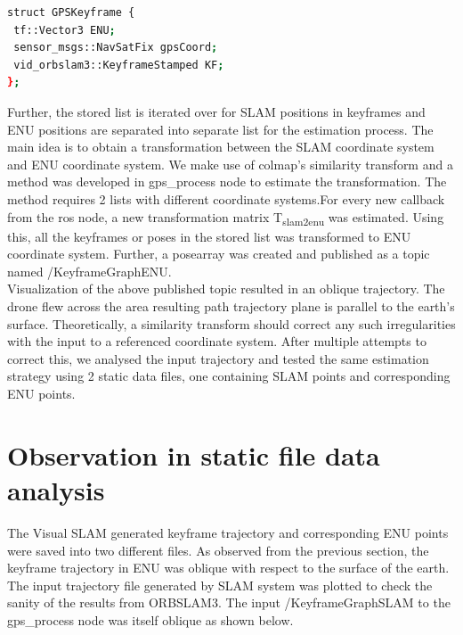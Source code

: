 \begin{lstlisting}[language=bash, basicstyle=\small]
struct GPSKeyframe {
 tf::Vector3 ENU;  
 sensor_msgs::NavSatFix gpsCoord; 
 vid_orbslam3::KeyframeStamped KF; 
};
\end{lstlisting}

Further, the stored list is iterated over for SLAM positions in keyframes and ENU positions are separated into separate list for the estimation process. The main idea is to obtain a transformation between the SLAM coordinate system and ENU coordinate system. We make use of colmap's \cite{schoenberger2016sfm} similarity transform and a method was developed in gps\_process node to estimate the transformation. The method requires 2 lists with different coordinate systems.For every new callback from the ros node, a new transformation matrix  T\textsubscript{slam2enu} was estimated. Using this, all the keyframes or poses in the stored list was transformed to ENU coordinate system. Further, a posearray was created and published as a topic named /KeyframeGraphENU.\\

Visualization of the above published topic resulted in an oblique trajectory. The drone flew across the area resulting path trajectory plane is parallel to the earth's surface. Theoretically, a similarity transform should correct any such irregularities with the input to a referenced coordinate system. After multiple attempts to correct this, we analysed the input trajectory and tested the same estimation strategy using 2 static data files, one containing SLAM points and corresponding ENU points. 

\section{Observation in static file data analysis}
\label{sec:staticapproach}
The Visual SLAM generated keyframe trajectory and corresponding ENU points were saved into two different files. As observed from the previous section, the keyframe trajectory in ENU was oblique with respect to the surface of the earth. The input trajectory file generated by SLAM system was plotted to check the sanity of the results from ORBSLAM3. The input /KeyframeGraphSLAM to the gps\_process node was itself oblique as shown below.

